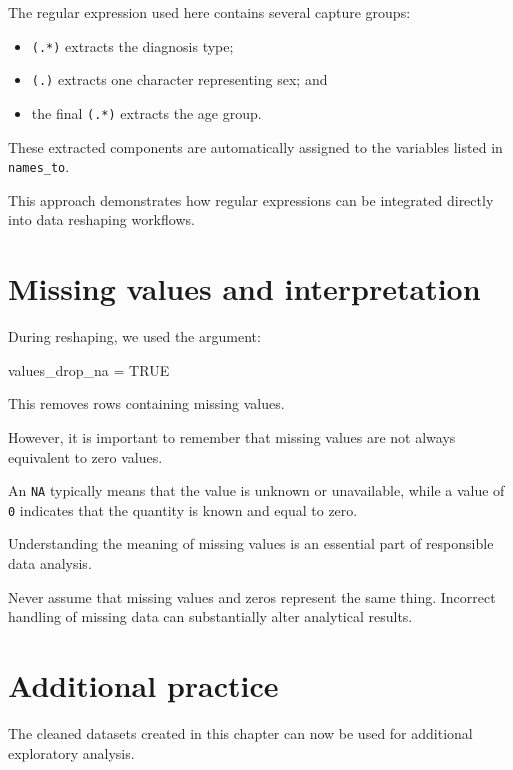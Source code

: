 \documentclass[
  11pt,
  oneside]{book}
\newenvironment{Shaded}{\begin{snugshade}}{\end{snugshade}}
\newcommand{\ConstantTok}[1]{\textcolor[rgb]{0.56,0.35,0.01}{#1}}
\newcommand{\NormalTok}[1]{#1}
\newcommand{\OtherTok}[1]{\textcolor[rgb]{0.56,0.35,0.01}{#1}}
\providecommand{\tightlist}{%
  \setlength{\itemsep}{0pt}\setlength{\parskip}{0pt}}
\begin{document}
The regular expression used here contains several capture groups:

\begin{itemize}
\tightlist
\item
  \texttt{(.*)} extracts the diagnosis type;
\item
  \texttt{(.)} extracts one character representing sex; and
\item
  the final \texttt{(.*)} extracts the age group.
\end{itemize}

These extracted components are automatically assigned to the variables listed in \texttt{names\_to}.

This approach demonstrates how regular expressions can be integrated directly into data reshaping workflows.

\section{Missing values and interpretation}\label{missing-values-and-interpretation}

During reshaping, we used the argument:

\begin{Shaded}
\begin{Highlighting}[]
\NormalTok{values\_drop\_na }\OtherTok{=} \ConstantTok{TRUE}
\end{Highlighting}
\end{Shaded}

This removes rows containing missing values.

However, it is important to remember that missing values are not always equivalent to zero values.

An \texttt{NA} typically means that the value is unknown or unavailable, while a value of \texttt{0} indicates that the quantity is known and equal to zero.

Understanding the meaning of missing values is an essential part of responsible data analysis.

Never assume that missing values and zeros represent the same thing. Incorrect handling of missing data can substantially alter analytical results.

\section{Additional practice}\label{additional-practice}

The cleaned datasets created in this chapter can now be used for additional exploratory analysis.
\end{document}
